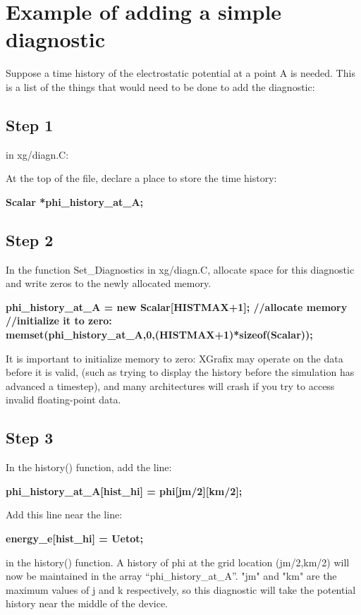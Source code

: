 \section{Example of adding a simple diagnostic}

Suppose a time history of the electrostatic
potential at a point A is needed.  This is a list of the things that would
need to be done to add the diagnostic:

\subsection{Step 1}
in xg/diagn.C:

At the top of the file, declare a place to store the time history:

{\bf Scalar *phi\_history\_at\_A;}

\subsection{Step 2}
In the function Set\_Diagnostics in xg/diagn.C, allocate
space for this diagnostic and write zeros to the newly allocated memory.

{\bf  phi\_history\_at\_A = new Scalar[HISTMAX+1];  //allocate memory \\
	 //initialize it to zero: \\
  memset(phi\_history\_at\_A,0,(HISTMAX+1)*sizeof(Scalar)); }

It is important to initialize memory to zero:  XGrafix may operate on the
data before it is valid, (such as trying to display the history before the
simulation has advanced a timestep), and many architectures will crash if
you try to access invalid floating-point data.

\subsection{Step 3}
In the history() function, add the line:

{\bf  phi\_history\_at\_A[hist\_hi] = phi[jm/2][km/2];}

Add this line near the line: 

{\bf  energy\_e[hist\_hi] = Uetot;}
  
in the history() function.  A history of phi at the grid location (jm/2,km/2)
will now be maintained in the array ``phi\_history\_at\_A''.  "jm" and "km"
are the maximum values of j and k respectively, so this diagnostic will
take the potential history near the middle of the device.

